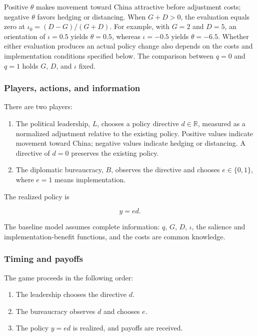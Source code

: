 \documentclass[referee,pdflatex,sn-basic]{sn-jnl}
\theoremstyle{thmstylethree}
\begin{document}
Positive \(\theta\) makes movement toward China attractive before adjustment costs; negative \(\theta\) favors hedging or distancing. When \(G+D>0\), the evaluation equals zero at \(\iota_0=(D-G)/(G+D)\). For example, with \(G=2\) and \(D=5\), an orientation of \(\iota=0.5\) yields \(\theta=0.5\), whereas \(\iota=-0.5\) yields \(\theta=-6.5\). Whether either evaluation produces an actual policy change also depends on the costs and implementation conditions specified below. The comparison between \(q=0\) and \(q=1\) holds \(G\), \(D\), and \(\iota\) fixed.

\subsubsection{Players, actions, and information}\label{players-actions-and-information}

There are two players:

\begin{enumerate}
\def\labelenumi{\arabic{enumi}.}
\item
  The political leadership, \(L\), chooses a policy directive \(d\in\mathbb{R}\), measured as a normalized adjustment relative to the existing policy. Positive values indicate movement toward China; negative values indicate hedging or distancing. A directive of \(d=0\) preserves the existing policy.
\item
  The diplomatic bureaucracy, \(B\), observes the directive and chooses \(e\in\{0,1\}\), where \(e=1\) means implementation.
\end{enumerate}

The realized policy is

\[
y=ed.
\]

The baseline model assumes complete information: \(q\), \(G\), \(D\), \(\iota\), the salience and implementation-benefit functions, and the costs are common knowledge.

\subsubsection{Timing and payoffs}\label{timing-and-payoffs}

The game proceeds in the following order:

\begin{enumerate}
\def\labelenumi{\arabic{enumi}.}
\item
  The leadership chooses the directive \(d\).
\item
  The bureaucracy observes \(d\) and chooses \(e\).
\item
  The policy \(y=ed\) is realized, and payoffs are received.
\end{enumerate}
\end{document}
